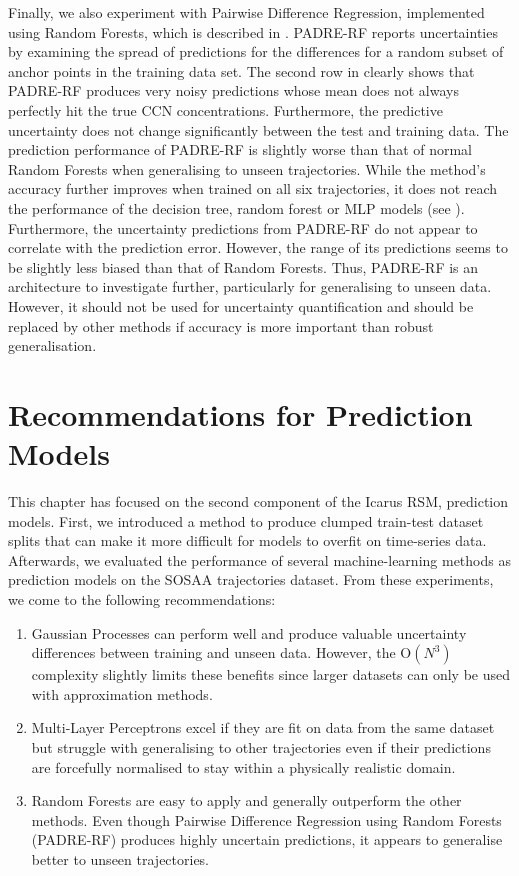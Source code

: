 \noindent Finally, we also experiment with Pairwise Difference Regression, implemented using Random Forests, which is described in . PADRE-RF reports uncertainties by examining the spread of predictions for the differences for a random subset of anchor points in the training data set. The second row in  clearly shows that PADRE-RF produces very noisy predictions whose mean does not always perfectly hit the true CCN concentrations. Furthermore, the predictive uncertainty does not change significantly between the test and training data. The prediction performance of PADRE-RF is slightly worse than that of normal Random Forests when generalising to unseen trajectories. While the method's accuracy further improves when trained on all six trajectories, it does not reach the performance of the decision tree, random forest or MLP models (see ). Furthermore, the uncertainty predictions from PADRE-RF do not appear to correlate with the prediction error. However, the range of its predictions seems to be slightly less biased than that of Random Forests. Thus, PADRE-RF is an architecture to investigate further, particularly for generalising to unseen data. However, it should not be used for uncertainty quantification and should be replaced by other methods if accuracy is more important than robust generalisation.

\section{Recommendations for Prediction Models} \label{txt:model-conclusions}

This chapter has focused on the second component of the Icarus RSM, prediction models. First, we introduced a method to produce clumped train-test dataset splits that can make it more difficult for models to overfit on time-series data. Afterwards, we evaluated the performance of several machine-learning methods as prediction models on the SOSAA trajectories dataset. From these experiments, we come to the following recommendations:

\begin{enumerate}
    \item Gaussian Processes can perform well and produce valuable uncertainty differences between training and unseen data. However, the $\text{O}(N^3)$ complexity slightly limits these benefits since larger datasets can only be used with approximation methods.
    \item Multi-Layer Perceptrons excel if they are fit on data from the same dataset but struggle with generalising to other trajectories even if their predictions are forcefully normalised to stay within a physically realistic domain.
    \item Random Forests are easy to apply and generally outperform the other methods. Even though Pairwise Difference Regression using Random Forests (PADRE-RF) produces highly uncertain predictions, it appears to generalise better to unseen trajectories.
\end{enumerate}

